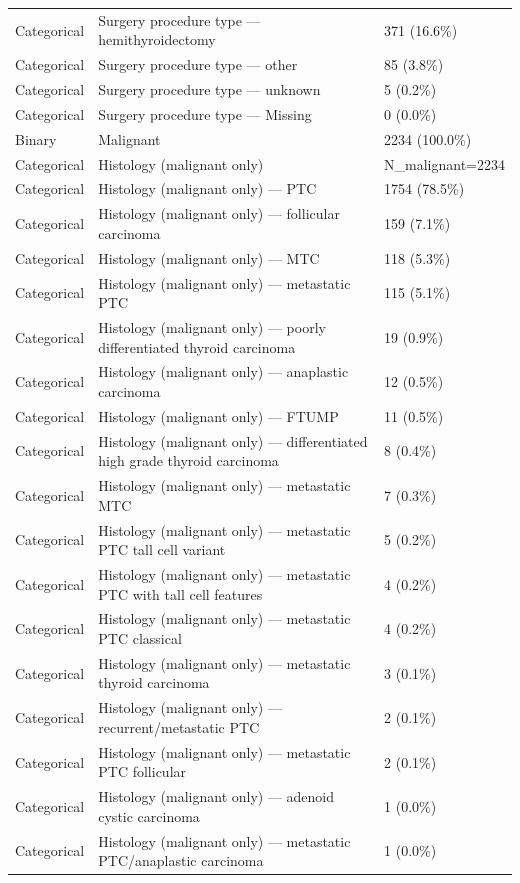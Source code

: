 \begin{table}[htbp]
\begin{tabular}{lll}
Categorical & Surgery procedure type — hemithyroidectomy & 371 (16.6\%) \\
Categorical & Surgery procedure type — other & 85 (3.8\%) \\
Categorical & Surgery procedure type — unknown & 5 (0.2\%) \\
Categorical & Surgery procedure type — Missing & 0 (0.0\%) \\
Binary & Malignant & 2234 (100.0\%) \\
Categorical & Histology (malignant only) & N\_malignant=2234 \\
Categorical & Histology (malignant only) — PTC & 1754 (78.5\%) \\
Categorical & Histology (malignant only) — follicular carcinoma & 159 (7.1\%) \\
Categorical & Histology (malignant only) — MTC & 118 (5.3\%) \\
Categorical & Histology (malignant only) — metastatic PTC & 115 (5.1\%) \\
Categorical & Histology (malignant only) — poorly differentiated thyroid carcinoma & 19 (0.9\%) \\
Categorical & Histology (malignant only) — anaplastic carcinoma & 12 (0.5\%) \\
Categorical & Histology (malignant only) — FTUMP & 11 (0.5\%) \\
Categorical & Histology (malignant only) — differentiated high grade thyroid carcinoma & 8 (0.4\%) \\
Categorical & Histology (malignant only) — metastatic MTC & 7 (0.3\%) \\
Categorical & Histology (malignant only) — metastatic PTC tall cell variant & 5 (0.2\%) \\
Categorical & Histology (malignant only) — metastatic PTC with tall cell features & 4 (0.2\%) \\
Categorical & Histology (malignant only) — metastatic PTC classical & 4 (0.2\%) \\
Categorical & Histology (malignant only) — metastatic thyroid carcinoma & 3 (0.1\%) \\
Categorical & Histology (malignant only) — recurrent/metastatic PTC & 2 (0.1\%) \\
Categorical & Histology (malignant only) — metastatic PTC follicular & 2 (0.1\%) \\
Categorical & Histology (malignant only) — adenoid cystic carcinoma & 1 (0.0\%) \\
Categorical & Histology (malignant only) — metastatic PTC/anaplastic carcinoma & 1 (0.0\%) \\

\end{tabular}
\end{table}
